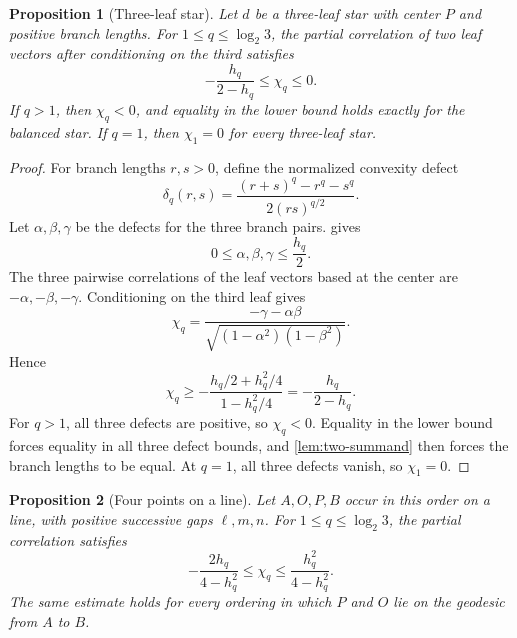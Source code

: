 \documentclass[11pt]{amsart}
\newtheorem{proposition}[proposition]{Proposition}
\theoremstyle{definition}
\theoremstyle{remark}
\begin{document}
\begin{proposition}[Three-leaf star]\label{prop:star-elementary}
Let \(d\) be a three-leaf star with center \(P\) and positive branch lengths. For \(1\leq q\leq\log_2 3\), the partial correlation of two leaf vectors after conditioning on the third satisfies
\begin{equation}\label{eq:star-elementary-bound}
 -\frac{h_q}{2-h_q}\leq\chi_q\leq0.
\end{equation}
If $q>1$, then $\chi_q<0$, and equality in the lower bound holds
exactly for the balanced star. If $q=1$, then $\chi_1=0$ for every
three-leaf star.
\end{proposition}

\begin{proof}
For branch lengths $r,s>0$, define the normalized convexity defect
\[
 \delta_q(r,s)
 =\frac{(r+s)^q-r^q-s^q}{2(rs)^{q/2}}.
\]
Let $\alpha,\beta,\gamma$ be the defects for the three branch pairs.
 gives
\[
 0\leq\alpha,\beta,\gamma\leq\frac{h_q}{2}.
\]
The three pairwise correlations of the leaf vectors based at the center are \(-\alpha,-\beta,-\gamma\). Conditioning on the third leaf gives
\[
 \chi_q=\frac{-\gamma-\alpha\beta}
 {\sqrt{(1-\alpha^2)(1-\beta^2)}}.
\]
Hence
\[
 \chi_q\geq
 -\frac{h_q/2+h_q^2/4}{1-h_q^2/4}
 =-\frac{h_q}{2-h_q}.
\]
For $q>1$, all three defects are positive, so $\chi_q<0$. Equality in the lower bound forces equality in all three defect bounds, and \cref{lem:two-summand} then forces the branch lengths to be equal. At $q=1$, all three defects vanish, so $\chi_1=0$.
\end{proof}

\begin{proposition}[Four points on a line]\label{prop:line-bound}
Let \(A,O,P,B\) occur in this order on a line, with positive successive
gaps \(\ell,m,n\). For \(1\leq q\leq\log_2 3\), the partial correlation
satisfies
\begin{equation}\label{eq:line-bound}
 -\frac{2h_q}{4-h_q^2}
 \leq\chi_q\leq
 \frac{h_q^2}{4-h_q^2}.
\end{equation}
The same estimate holds for every ordering in which \(P\) and \(O\) lie on the geodesic from \(A\) to \(B\).
\end{proposition}
\end{document}
